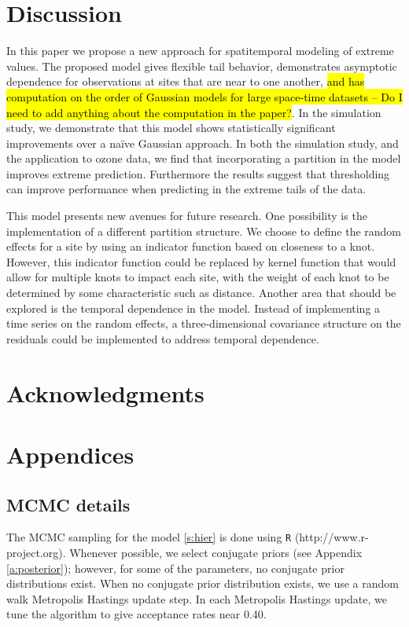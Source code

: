 \documentclass[11pt]{article}
\begin{document}
\section{Discussion}\label{s:con}
In this paper we propose a new approach for spatitemporal modeling of extreme values.
The proposed model gives flexible tail behavior, demonstrates asymptotic dependence for observations at sites that are near to one another, \hl{and has computation on the order of Gaussian models for large space-time datasets -- Do I need to add anything about the computation in the paper?}.
In the simulation study, we demonstrate that this model shows statistically significant improvements over a na\"{i}ve Gaussian approach.
In both the simulation study, and the application to ozone data, we find that incorporating a partition in the model improves extreme prediction.
Furthermore the results suggest that thresholding can improve performance when predicting in the extreme tails of the data.

This model presents new avenues for future research.
One possibility is the implementation of a different partition structure.
We choose to define the random effects for a site by using an indicator function based on closeness to a knot.
However, this indicator function could be replaced by kernel function that would allow for multiple knots to impact each site, with the weight of each knot to be determined by some characteristic such as distance.
Another area that should be explored is the temporal dependence in the model.
Instead of implementing a time series on the random effects, a three-dimensional covariance structure on the residuals could be implemented to address temporal dependence.

\section*{Acknowledgments}

\appendix
\section{Appendices}
\subsection{MCMC details} \label{a:mcmc}
The MCMC sampling for the model \ref{s:hier} is done using {\tt R} (http://www.r-project.org). Whenever possible, we select conjugate priors (see Appendix \ref{a:posterior}); however, for some of the parameters, no conjugate prior distributions exist.
When no conjugate prior distribution exists, we use a random walk Metropolis Hastings update step.
In each Metropolis Hastings update, we tune the algorithm to give acceptance rates near 0.40.
\end{document}

